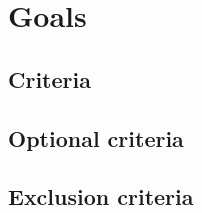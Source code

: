 \section{Goals}
\subsection{Criteria} %

\subsection{Optional criteria}

\subsection{Exclusion criteria}
